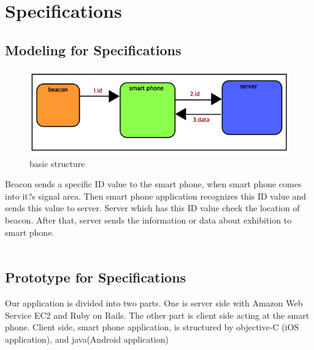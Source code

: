 \documentclass[conference]{IEEEtran}
\begin{document}
\section{Specifications}
\subsection{Modeling for Specifications \\}


\begin{figure}[htbp]
\begin{center}
    \includegraphics[scale=0.4]{img_01.jpg}
    \caption{basic structure} 
\end{center}
\end{figure}


\quad Beacon sends a specific ID value to the smart phone, when smart phone comes into it?s signal area. Then smart phone application recognizes this ID value and sends this value to server. Server which has this ID value check the location of beacon. After that, server sends the information or data about exhibition to smart phone.\\\\

\subsection{Prototype for Specifications}
\quad Our application is divided into two parts. One is server side with Amazon Web Service EC2 and
Ruby on Rails. The other part is client side acting at the smart phone. Client side, smart phone application, is structured by objective-C (iOS application), and java(Android application)\\\\\\\\\\\\\\\\\\\\\\\\\\\\\\\\\\\\\\
\end{document}
